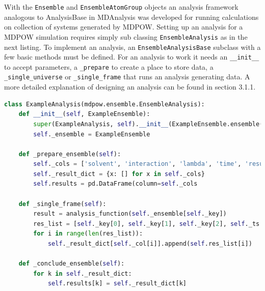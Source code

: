 \documentclass{article}[letterpaper, margins=1in, 12pt]
\begin{document}
With the \texttt{Ensemble} and \texttt{EnsembleAtomGroup} objects an analysis framework analogous to AnalysisBase in MDAnalysis was developed for running calculations on collection of systems generated by MDPOW. Setting up an analysis for a MDPOW simulation requires simply sub classing \texttt{EnsembleAnalysis} as in the next listing. To implement an analysis, an \texttt{EnsembleAnalysisBase} subclass with a few basic methods must be defined. For an analysis to work it needs an \lstinline{__init__} to accept parameters, a \lstinline{_prepare} to create a place to store data, a \lstinline{_single_universe} or \lstinline{_single_frame} that runs an analysis generating data. A more detailed explanation of designing an analysis can be found in section 3.1.1.

\begin{lstlisting}[language=Python]
class ExampleAnalysis(mdpow.ensemble.EnsembleAnalysis):
	def __init__(self, ExampleEnsemble):
		super(ExampleAnalysis, self).__init__(ExampleEnsemble.ensemble())
		self._ensemble = ExampleEnsemble

	def _prepare_ensemble(self):
		self._cols = ['solvent', 'interaction', 'lambda', 'time', 'result']
		self._result_dict = {x: [] for x in self._cols}
		self.results = pd.DataFrame(column=self._cols

	def _single_frame(self):
		result = analysis_function(self._ensemble[self._key])
		res_list = [self._key[0], self._key[1], self._key[2], self._ts.time, result]
		for i in range(len(res_list)):
			self._result_dict[self._col[i]].append(self.res_list[i])

	def _conclude_ensemble(self):
		for k in self._result_dict:
			self.results[k] = self._result_dict[k]

\end{lstlisting}
\end{document}
